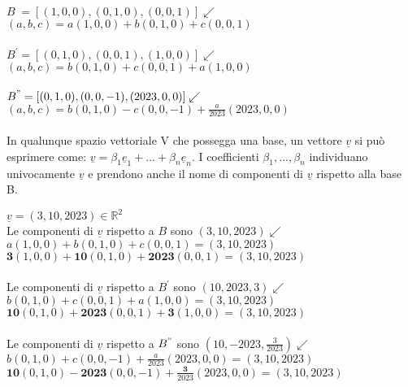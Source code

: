   \begin{proposizione}
    \phantom{}\\
    $B^{\phantom{'}}=[(1,0,0),(0,1,0),(0,0,1)]\swarrow$\\
    \phantom{texttt}$(a,b,c)=a(1,0,0)+b(0,1,0)+c(0,0,1)$\\\\
    $B^{'}=[(0,1,0),(0,0,1),(1,0,0)]\swarrow$\\
    \phantom{texttt}$(a,b,c)=b(0,1,0)+c(0,0,1)+a(1,0,0)$\\\\
    $B^{"}=[(0,1,0),(0,0,-1),(2023,0,0)]\swarrow$\\
    \phantom{texttt}$(a,b,c)=b(0,1,0)-c(0,0,-1)+\frac{a}{2023}(2023,0,0)$\\\\
    In qualunque spazio vettoriale V che possegga una base, un
    vettore $\underline{v}$ si può esprimere come:
    $\underline{v}=\beta_1\underline{e}_1+...+\beta_n\underline{e}_n$.
    I coefficienti $\beta_1,...,\beta_n$ individuano univocamente
    $\underline{v}$ e prendono anche il nome di componenti di
    $\underline{v}$ rispetto alla base B.
    \begin{es}
      $\underline{v}=(3,10,2023)\in\mathbb{R}^{2}$\\
      Le componenti di $\underline{v}$ rispetto a $B$ sono
      $(3,10,2023) \swarrow$\\
      $a(1,0,0)+b(0,1,0)+c(0,0,1)=(3,10,2023)$\\
      $\textbf{3}(1,0,0)+\textbf{10}(0,1,0)+\textbf{2023}(0,0,1)=(3,10,2023)$\\\\
      Le componenti di $\underline{v}$ rispetto a $B^{'}$ sono
      $(10,2023,3) \swarrow$\\
      $b(0,1,0)+c(0,0,1)+a(1,0,0)=(3,10,2023)$\\
      $\textbf{10}(0,1,0)+\textbf{2023}(0,0,1)+\textbf{3}(1,0,0)=(3,10,2023)$\\\\
      Le componenti di $\underline{v}$ rispetto a $B^{"}$ sono
      $(10,-2023,\frac{3}{2023}) \swarrow$\\
      $b(0,1,0)+c(0,0,-1)+\frac{a}{2023}(2023,0,0)=(3,10,2023)$\\
      $\textbf{10}(0,1,0)-\textbf{2023}(0,0,-1)+\frac{\textbf{3}}{2023}(2023,0,0)=(3,10,2023)$
    \end{es}
    \begin{es}
      $B=[
        \begin{pmatrix}

\end{pmatrix}
\end{es}
\end{proposizione}
